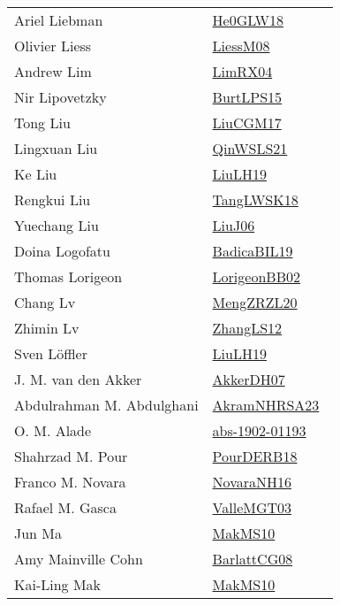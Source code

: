 {\begin{longtable}{p{4cm}p{20cm}}
Ariel Liebman & \href{papers/He0GLW18.pdf}{He0GLW18}~\cite{He0GLW18}\\
Olivier Liess & \href{articles/LiessM08.pdf}{LiessM08}~\cite{LiessM08}\\
Andrew Lim & \href{papers/LimRX04.pdf}{LimRX04}~\cite{LimRX04}\\
Nir Lipovetzky & \href{papers/BurtLPS15.pdf}{BurtLPS15}~\cite{BurtLPS15}\\
Tong Liu & \href{papers/LiuCGM17.pdf}{LiuCGM17}~\cite{LiuCGM17}\\
Lingxuan Liu & \href{articles/QinWSLS21.pdf}{QinWSLS21}~\cite{QinWSLS21}\\
Ke Liu & \href{papers/LiuLH19.pdf}{LiuLH19}~\cite{LiuLH19}\\
Rengkui Liu & \href{}{TangLWSK18}~\cite{TangLWSK18}\\
Yuechang Liu & \href{papers/LiuJ06.pdf}{LiuJ06}~\cite{LiuJ06}\\
Doina Logofatu & \href{papers/BadicaBIL19.pdf}{BadicaBIL19}~\cite{BadicaBIL19}\\
Thomas Lorigeon & \href{}{LorigeonBB02}~\cite{LorigeonBB02}\\
Chang Lv & \href{articles/MengZRZL20.pdf}{MengZRZL20}~\cite{MengZRZL20}\\
Zhimin Lv & \href{papers/ZhangLS12.pdf}{ZhangLS12}~\cite{ZhangLS12}\\
Sven L{\"{o}}ffler & \href{papers/LiuLH19.pdf}{LiuLH19}~\cite{LiuLH19}\\
J. M. van den Akker & \href{papers/AkkerDH07.pdf}{AkkerDH07}~\cite{AkkerDH07}\\
Abdulrahman M. Abdulghani & \href{articles/AkramNHRSA23.pdf}{AkramNHRSA23}~\cite{AkramNHRSA23}\\
O. M. Alade & \href{articles/abs-1902-01193.pdf}{abs-1902-01193}~\cite{abs-1902-01193}\\
Shahrzad M. Pour & \href{articles/PourDERB18.pdf}{PourDERB18}~\cite{PourDERB18}\\
Franco M. Novara & \href{articles/NovaraNH16.pdf}{NovaraNH16}~\cite{NovaraNH16}\\
Rafael M. Gasca & \href{papers/ValleMGT03.pdf}{ValleMGT03}~\cite{ValleMGT03}\\
Jun Ma & \href{papers/MakMS10.pdf}{MakMS10}~\cite{MakMS10}\\
Amy Mainville Cohn & \href{papers/BarlattCG08.pdf}{BarlattCG08}~\cite{BarlattCG08}\\
Kai{-}Ling Mak & \href{papers/MakMS10.pdf}{MakMS10}~\cite{MakMS10}\\

\end{longtable}}
